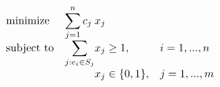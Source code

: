 \begin{equation*}
\begin{array}{ll@{}ll}
\text{minimize}  & \displaystyle\sum\limits_{j=1}^{n} c_{j}&x_{j} &\\
\text{subject to}& \displaystyle\sum\limits_{j:e_{i} \in S_{j}}   &x_{j} \geq 1,  &i=1 ,..., n\\
                 &                                                &x_{j} \in \{0,1\}, &j=1 ,..., m
\end{array}
\end{equation*}